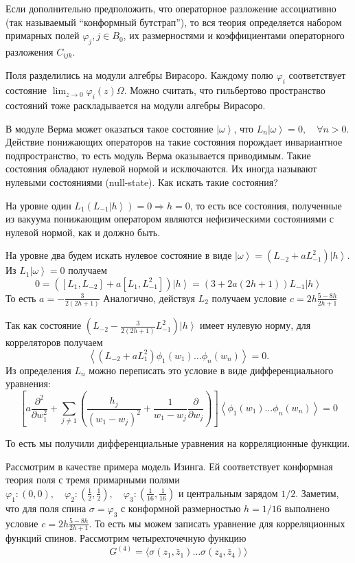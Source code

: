\documentclass[a4paper,12pt]{article}
\theoremstyle{definition}
\begin{document}
Если дополнительно предположить, что операторное разложение
ассоциативно (так называемый ``конформный бутстрап''),  то вся теория
определяется набором примарных полей $\varphi_{j}, j\in B_{0}$,  их
размерностями и коэффициентами операторного разложения $C_{ijk}$. 

Поля разделились на модули алгебры Вирасоро. Каждому полю $\varphi_i$
соответствует состояние $\lim_{z\to 0}\varphi_i(z)\Omega$. Можно
считать, что гильбертово пространство состояний тоже раскладывается на
модули алгебры Вирасоро.

В модуле Верма может оказаться такое состояние $\left|\omega\right>$,
что $L_{n}\left|\omega\right>=0, \quad \forall  n>0$. Действие
понижающих операторов на такие состояния порождает  инвариантное
подпространство, то есть модуль Верма оказывается  приводимым. Такие
состояния обладают нулевой нормой и  исключаются. Их иногда называют
нулевыми состояниями (null-state).  Как искать  такие состояния?

На уровне один
$L_{1}\left(L_{-1}\left|h\right>\right)=0\Longrightarrow h=0$, то есть
все состояния, полученные из  вакуума понижающим оператором являются
нефизическими состояниями с нулевой нормой, как и должно быть. 

На уровне два будем искать нулевое состояние в виде
$\left|\omega\right>=(L_{-2}+a L_{-1}^{2})\left| h \right> $. Из
$L_{1}\left|\omega\right>=0$ получаем
$$ 0=([L_{1},L_{-2}] +a [L_{1},L_{-1}^{2}])\left|h\right> = (3+2a(2h+1))L_{-1}\left|h\right>$$
То есть  $ a=-\frac{3}{2(2h+1)}$
Аналогично, действуя $L_{2}$ получаем условие $ c=2h\frac{5-8h}{2h+1}$

Так как состояние $(L_{-2}-\frac{3}{2(2h+1)}
L_{-1}^{2})\left|h\right>$ имеет нулевую норму, для корреляторов
получаем
 $$\left<(L_{-2}+aL_{1}^{2})\phi_{1}(w_{1}) \dots \phi_{n}(w_{n}) \right>=0.$$ 
Из определения $L_{n}$ можно переписать это условие в виде дифференциального уравнения:
$$\left[  a \frac{\partial^{2}}{\partial w_{1}^{2}} +\sum_{j\neq 1} \left(\frac{h_{j}}{(w_{1}-w_{j})^{2}}+\frac{1}{w_{1}-w_{j}} \frac{\partial}{\partial w_{j}}\right)\right] \left< \phi_{1}(w_{1}) \dots \phi_{n}(w_{n}) \right> =0$$

То есть мы получили дифференциальные уравнения на корреляционные функции. 

Рассмотрим в качестве примера модель Изинга. Ей соответствует
конформная теория поля с тремя примарными полями
$\varphi_{1}: (0,0),\quad \varphi_{2}:
\left(\frac{1}{2},\frac{1}{2}\right),\quad
\varphi_{3}:\left(\frac{1}{16},\frac{1}{16}\right)$ и центральным
зарядом $1/2$. Заметим, что для поля спина $\sigma=\varphi_{3}$ с конформной
размерностью $h=1/16$ выполнено условие $  c=2h\frac{5-8h}{2h+1}$. То есть мы можем записать уравнение для корреляционных функций спинов. Рассмотрим четырехточечную функцию
   $$G^{(4)} =\langle \sigma(z_1,\bar z_1)\dots \sigma(z_4,\bar z_4)\rangle$$
\end{document}

